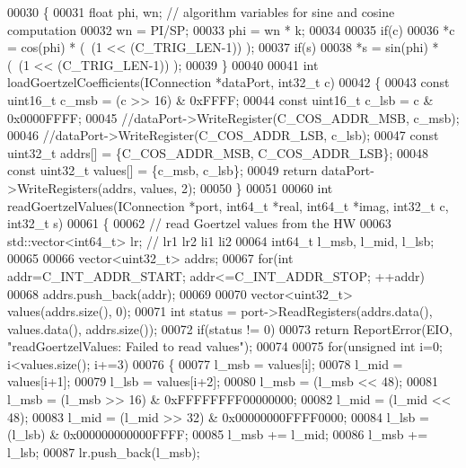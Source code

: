 \begin{DoxyCode}
00030 \{
00031     \textcolor{keywordtype}{float} phi, wn; \textcolor{comment}{// algorithm variables for sine and cosine computation}
00032     wn = PI/SP;
00033     phi = wn * k;
00034 
00035     \textcolor{keywordflow}{if}(c)
00036         *c =  cos(phi) * (~(1 << (C_TRIG_LEN-1)) );
00037     \textcolor{keywordflow}{if}(s)
00038         *s =  sin(phi) * (~(1 << (C_TRIG_LEN-1)) );
00039 \}
00040 
00041 \textcolor{keywordtype}{int} loadGoertzelCoefficients(IConnection *dataPort, int32\_t c)
00042 \{
00043     \textcolor{keyword}{const} uint16\_t c\_msb = (c >> 16) & 0xFFFF;
00044     \textcolor{keyword}{const} uint16\_t c\_lsb =  c & 0x0000FFFF;
00045     \textcolor{comment}{//dataPort->WriteRegister(C\_COS\_ADDR\_MSB, c\_msb);}
00046     \textcolor{comment}{//dataPort->WriteRegister(C\_COS\_ADDR\_LSB, c\_lsb);}
00047     \textcolor{keyword}{const} uint32\_t addrs[] = \{C_COS_ADDR_MSB, C_COS_ADDR_LSB\};
00048     \textcolor{keyword}{const} uint32\_t values[] = \{c\_msb, c\_lsb\};
00049     \textcolor{keywordflow}{return} dataPort->WriteRegisters(addrs, values, 2);
00050 \}
00051 
00060 \textcolor{keywordtype}{int} readGoertzelValues(IConnection *port, int64\_t *real, int64\_t *imag, int32\_t 
      c, int32\_t s)
00061 \{
00062     \textcolor{comment}{// read Goertzel values from the HW}
00063     std::vector<int64\_t> lr;  \textcolor{comment}{// lr1 lr2 li1 li2}
00064     int64\_t l\_msb, l\_mid, l\_lsb;
00065 
00066     vector<uint32\_t> addrs;
00067     \textcolor{keywordflow}{for}(\textcolor{keywordtype}{int} addr=C_INT_ADDR_START; addr<=C_INT_ADDR_STOP; ++addr)
00068         addrs.push\_back(addr);
00069 
00070     vector<uint32\_t> values(addrs.size(), 0);
00071     \textcolor{keywordtype}{int} status = port->ReadRegisters(addrs.data(), values.data(), addrs.size());
00072     \textcolor{keywordflow}{if}(status != 0)
00073         \textcolor{keywordflow}{return} ReportError(EIO, \textcolor{stringliteral}{"readGoertzelValues: Failed to read values"});
00074 
00075     \textcolor{keywordflow}{for}(\textcolor{keywordtype}{unsigned} \textcolor{keywordtype}{int} i=0; i<values.size(); i+=3)
00076     \{
00077         l\_msb = values[i];
00078         l\_mid = values[i+1];
00079         l\_lsb = values[i+2];
00080         l\_msb = (l\_msb << 48);
00081         l\_msb = (l\_msb >> 16) & 0xFFFFFFFF00000000;
00082         l\_mid = (l\_mid << 48);
00083         l\_mid = (l\_mid >> 32) & 0x00000000FFFF0000;
00084         l\_lsb = (l\_lsb) & 0x000000000000FFFF;
00085         l\_msb += l\_mid;
00086         l\_msb += l\_lsb;
00087         lr.push\_back(l\_msb);

\end{DoxyCode}
